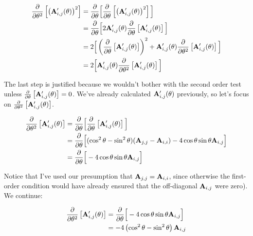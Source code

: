 \documentclass[11pt, oneside]{amsart}
\begin{document}
\begin{equation*}
  \begin{split}
      \frac{\partial }{\partial \theta^2} \left[ \left( \mathbf{A}'_{i, j}(\theta) \right)^2 \right]
    ={}&
      \frac{\partial }{\partial \theta} \Big[
        \frac{\partial }{\partial \theta} \left[ \left( \mathbf{A}'_{i, j}(\theta) \right)^2 \right]
      \Big] \\
    ={}&
      \frac{\partial }{\partial \theta} \Big[
        2
        \mathbf{A}'_{i, j}(\theta)
        \frac{\partial }{\partial \theta} \left[ \mathbf{A}'_{i, j}(\theta) \right]
      \Big] \\
    ={}&
      2 \Big[
        \left( \frac{\partial }{\partial \theta} \left[ \mathbf{A}'_{i, j}(\theta) \right] \right)^2
        +
        \mathbf{A}'_{i, j}(\theta)
        \frac{\partial }{\partial \theta^2} \left[ \mathbf{A}'_{i, j}(\theta) \right]
      \Big] \\
    ={}&
      2 \Big[
        \mathbf{A}'_{i, j}(\theta)
        \frac{\partial }{\partial \theta^2} \left[ \mathbf{A}'_{i, j}(\theta) \right]
      \Big]
  \end{split}
\end{equation*}

The last step is justified because we wouldn't bother with the second
order test unless $\frac{\partial }{\partial \theta} \left[ \mathbf{A}'_{i, j}(\theta) \right] = 0$.
We've already calculated $\mathbf{A}'_{i, j}(\theta)$ previously, so let's
focus on $\frac{\partial }{\partial \theta^2} \left[ \mathbf{A}'_{i, j}(\theta) \right]$.

\begin{equation*}
  \begin{split}
      \frac{\partial }{\partial \theta^2} \left[ \mathbf{A}'_{i, j}(\theta) \right]
    &=
      \frac{\partial }{\partial \theta} \Big[ \frac{\partial }{\partial \theta} \left[ \mathbf{A}'_{i, j}(\theta) \right] \Big] \\
    &=
      \frac{\partial }{\partial \theta} \Big[
        (\cos^2\theta - \sin^2\theta) (\mathbf{A}_{j, j} - \mathbf{A}_{i, i})
        - 4 \cos\theta\sin\theta \mathbf{A}_{i, j}
      \Big] \\
    &=
      \frac{\partial }{\partial \theta} \Big[
        -4\cos\theta\sin\theta \mathbf{A}_{i, j}
      \Big]
  \end{split}
\end{equation*}

Notice that I've used our presumption that $\mathbf{A}_{j, j} = \mathbf{A}_{i,
i}$, since otherwise the first-order condition would have already
ensured that the off-diagonal $\mathbf{A}_{i, j}$ were zero). We continue:

\begin{equation*}
  \begin{split}
      \frac{\partial }{\partial \theta^2} \left[ \mathbf{A}'_{i, j}(\theta) \right]
    &=
      \frac{\partial }{\partial \theta} \Big[ -4\cos\theta\sin\theta \mathbf{A}_{i, j} \Big] \\
    &=
      -4 \left( \cos^2\theta - \sin^2\theta \right) \mathbf{A}_{i, j}
  \end{split}
\end{equation*}
\end{document}
